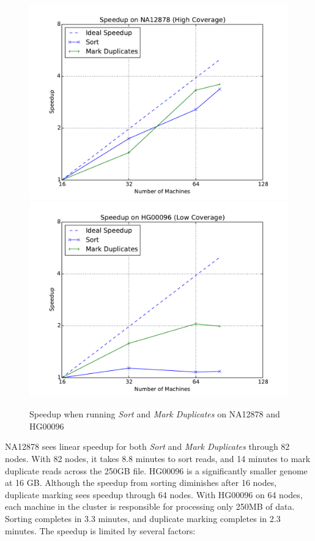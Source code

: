 \documentclass{acm_proc_article-sp}
\begin{document}
\begin{figure}[h]
\begin{center}
\includegraphics[width=0.99\linewidth]{graphs/speedup_na12878.pdf}
\includegraphics[width=0.99\linewidth]{graphs/speedup_hg00096.pdf}
\end{center}
\caption{Speedup when running \textit{Sort} and \textit{Mark Duplicates} on NA12878 and HG00096}
\label{fig:speedup}
\end{figure}

NA12878 sees linear speedup for both \textit{Sort} and \textit{Mark Duplicates} through 82 nodes. With
82 nodes, it takes 8.8 minutes to sort reads, and 14 minutes to mark duplicate reads across the 250GB
file. HG00096 is a significantly smaller genome at 16 GB. Although the speedup from sorting diminishes
after 16 nodes, duplicate marking sees speedup through 64 nodes. With HG00096 on 64 nodes, each
machine in the cluster is responsible for processing only 250MB of data. Sorting completes in 3.3
minutes, and duplicate marking completes in 2.3 minutes. The speedup is limited by several factors:
\end{document}
